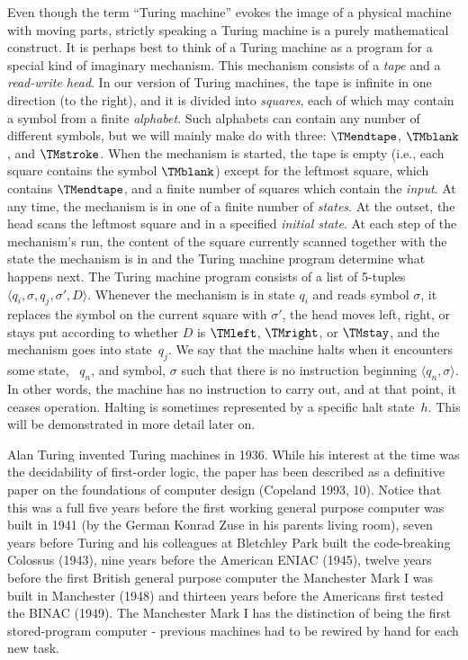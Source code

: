 \documentclass[../../../include/open-logic-section]{subfiles}
\begin{document}
\begin{explain}
 Even though the term ``Turing machine'' evokes the image of
a physical machine with moving parts, strictly speaking a Turing machine is
a purely mathematical construct. It is perhaps best to think of a Turing
machine as a program for a special kind of imaginary mechanism. This
mechanism consists of a \emph{tape} and a \emph{read-write head}. In our
version of Turing machines, the tape is infinite in one direction (to the
right), and it is divided into \emph{squares}, each of which may contain a
symbol from a finite \emph{alphabet}. Such alphabets can contain any number
of different symbols, but we will mainly make do with three: $\TMendtape$,
$\TMblank$, and $\TMstroke$. When the mechanism is started, the tape is
empty (i.e., each square contains the symbol $\TMblank$) except for the
leftmost square, which contains $\TMendtape$, and a finite number of
squares which contain the \emph{input}. At any time, the mechanism is in
one of a finite number of \emph{states}. At the outset, the head scans the
leftmost square and in a specified \emph{initial state}. At each step of
the mechanism's run, the content of the square currently scanned together
with the state the mechanism is in and the Turing machine program determine
what happens next. The Turing machine program consists of a list of
5-tuples $\langle q_i, \sigma, q_j, \sigma', D\rangle$. Whenever the
mechanism is in state $q_i$ and reads symbol $\sigma$, it replaces the
symbol on the current square with $\sigma'$, the head moves left, right, or
stays put according to whether $D$ is $\TMleft$, $\TMright$, or $\TMstay$,
and the mechanism goes into state~$q_j$. We say that the machine halts when
it encounters some state, ~$q_n$, and symbol, $\sigma$ such that there is
no instruction beginning $\langle q_n, \sigma\rangle$. In other words, the
machine has no instruction to carry out, and at that point, it ceases
operation. Halting is sometimes represented by a specific halt state~$h$.
This will be demonstrated in more detail later on.

Alan Turing invented Turing machines in 1936. While his interest at the
time was the decidability of first-order logic, the paper has been
described as a definitive paper on the foundations of computer design
(Copeland 1993, 10). Notice that this was a full five years before the
first working general purpose computer was built in 1941 (by the German
Konrad Zuse in his parents living room), seven years before Turing and his
colleagues at Bletchley Park built the code-breaking Colossus (1943), nine
years before the American ENIAC (1945), twelve years before the first
British general purpose computer the Manchester Mark I was built in
Manchester (1948) and thirteen years before the Americans first tested the
BINAC (1949). The Manchester Mark I has the distinction of being the first
stored-program computer - previous machines had to be rewired by hand for
each new task. \end{explain}
\end{document}
